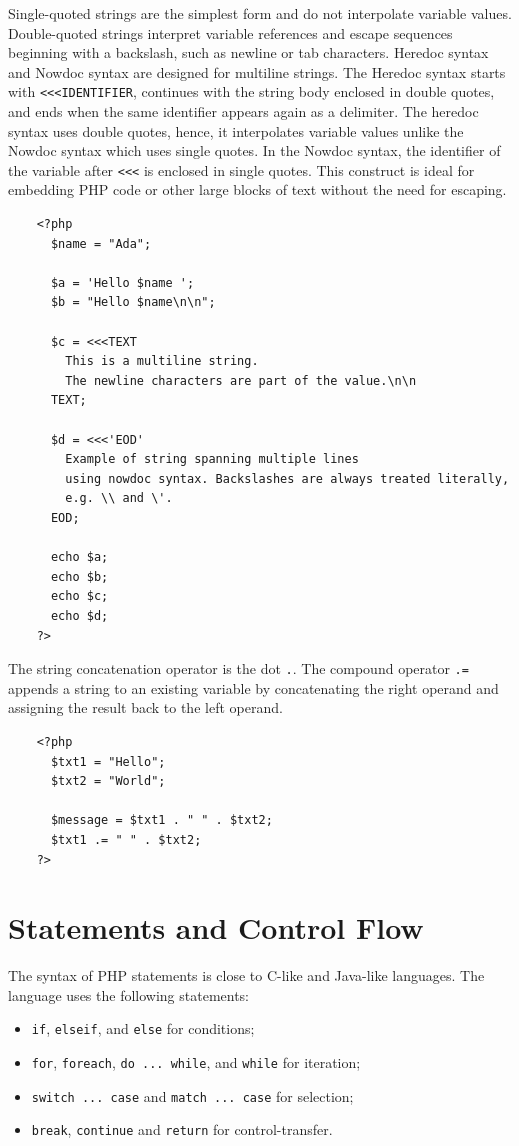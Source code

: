 \documentclass{scrbook}
\begin{document}
	Single-quoted strings are the simplest form and do not interpolate variable values. Double-quoted strings interpret variable references and escape sequences beginning with a backslash, such as newline or tab characters. Heredoc syntax and Nowdoc syntax are designed for multiline strings. The Heredoc syntax starts with \texttt{<<<IDENTIFIER}, continues with the string body enclosed in double quotes, and ends when the same identifier appears again as a delimiter. The heredoc syntax uses double quotes, hence, it interpolates variable values unlike the Nowdoc syntax which uses single quotes. In the Nowdoc syntax, the identifier of the variable after \texttt{<<<} is enclosed in single quotes. This construct is ideal for embedding PHP code or other large blocks of text without the need for escaping.
	
	\begin{lstlisting}
	<?php
	  $name = "Ada";
		
	  $a = 'Hello $name ';
	  $b = "Hello $name\n\n";
		
	  $c = <<<TEXT
		This is a multiline string.
		The newline characters are part of the value.\n\n
	  TEXT;
	  
	  $d = <<<'EOD'
		Example of string spanning multiple lines
		using nowdoc syntax. Backslashes are always treated literally,
		e.g. \\ and \'.
	  EOD;
		
	  echo $a;
	  echo $b;
	  echo $c;
	  echo $d;
	?>
	\end{lstlisting}
	
	The string concatenation operator is the dot \texttt{.}. The compound operator \texttt{.=} appends a string to an existing variable by concatenating the right operand and assigning the result back to the left operand.
	
	\begin{lstlisting}
	<?php
	  $txt1 = "Hello";
	  $txt2 = "World";
	
	  $message = $txt1 . " " . $txt2;
	  $txt1 .= " " . $txt2;
	?>
	\end{lstlisting}
	
	\section{Statements and Control Flow}
	
	The syntax of PHP statements is close to C-like and Java-like languages. The language uses the following statements:
	\begin{itemize}
		\item \texttt{if}, \texttt{elseif}, and \texttt{else} for conditions;
		\item \texttt{for}, \texttt{foreach}, \texttt{do ... while}, and \texttt{while} for iteration;
		\item \texttt{switch ... case} and \texttt{match ... case} for selection;
		\item \texttt{break}, \texttt{continue} and \texttt{return} for control-transfer.
	\end{itemize}
	
\end{document}
